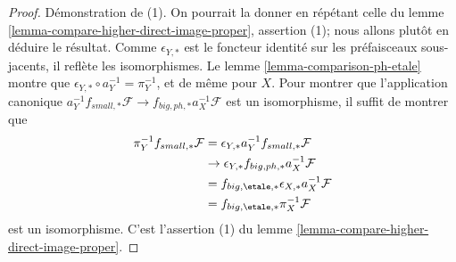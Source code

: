 \begin{proof}
Démonstration de (1). On pourrait la donner en répétant celle du lemme
\ref{lemma-compare-higher-direct-image-proper}, assertion (1); nous allons
plutôt en déduire le résultat. Comme $\epsilon_{Y, *}$ est le foncteur identité
sur les préfaisceaux sous-jacents, il reflète les isomorphismes. Le lemme
\ref{lemma-comparison-ph-etale} montre que
$\epsilon_{Y, *} \circ a_Y^{-1} = \pi_Y^{-1}$, et de même pour $X$.
Pour montrer que l'application canonique
$a_Y^{-1}f_{small, *}\mathcal{F} \to f_{big, ph, *}a_X^{-1}\mathcal{F}$
est un isomorphisme, il suffit de montrer que
\begin{align*}
\pi_Y^{-1}f_{small, *}\mathcal{F}
& =
\epsilon_{Y, *}a_Y^{-1}f_{small, *}\mathcal{F} \\
& \to 
\epsilon_{Y, *}f_{big, ph, *}a_X^{-1}\mathcal{F} \\
& =
f_{big, \etale, *} \epsilon_{X, *}a_X^{-1}\mathcal{F} \\
& =
f_{big, \etale, *}\pi_X^{-1}\mathcal{F}
\end{align*}
est un isomorphisme. C'est l'assertion (1) du lemme
\ref{lemma-compare-higher-direct-image-proper}.


\end{proof}
